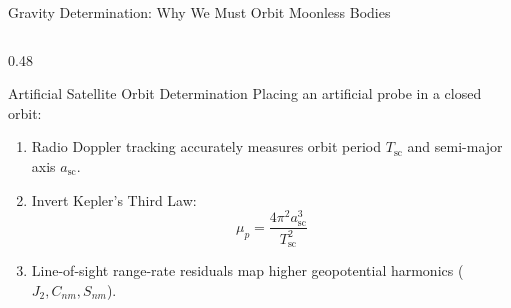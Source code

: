 \documentclass[aspectratio=169, 10pt]{beamer}
\begin{document}
\begin{frame}{Gravity Determination: Why We Must Orbit Moonless Bodies}
\begin{columns}[t]
        \begin{column}{0.48\textwidth}
            \begin{block}{Artificial Satellite Orbit Determination}
                \scriptsize
                Placing an artificial probe in a closed orbit:
                \begin{enumerate}\setlength{\itemsep}{1pt}\setlength{\topsep}{1pt}
                    \item Radio Doppler tracking accurately measures orbit period $T_{\text{sc}}$ and semi-major axis $a_{\text{sc}}$.
                    \item Invert Kepler's Third Law:
                    \vspace{-0.12cm}
                    \begin{equation*}
                        \mu_p = \frac{4\pi^2 a_{\text{sc}}^3}{T_{\text{sc}}^2}
                    \end{equation*}
                    \vspace{-0.2cm}
                    \item Line-of-sight range-rate residuals map higher geopotential harmonics ($J_2, C_{nm}, S_{nm}$).
                \end{enumerate}
            \end{block}
        \end{column}
    \end{columns}
\end{frame}
\end{document}
